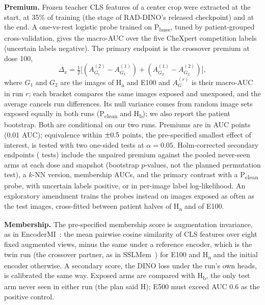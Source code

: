 \documentclass{article}
\begin{document}
\textbf{Premium.} Frozen teacher CLS features of a center crop were extracted at the start, at 35\% of training (the stage of RAD-DINO's released checkpoint) and at the end. A one-vs-rest logistic probe trained on P\textsubscript{base}, tuned by patient-grouped cross-validation, gives the macro-AUC over the five CheXpert competition labels (uncertain labels negative). The primary endpoint is the crossover premium at dose 100,
\begin{equation}
\Delta_x=\tfrac12\big[(A^{(2)}_{G_1}-A^{(1)}_{G_1})+(A^{(1)}_{G_2}-A^{(2)}_{G_2})\big],
\end{equation}
where $G_1$ and $G_2$ are the images of H\textsubscript{a} and E100 and $A^{(r)}_G$ is their macro-AUC in run $r$; each bracket compares the same images exposed and unexposed, and the average cancels run differences. Its null variance comes from random image sets exposed equally in both runs (P\textsubscript{clean} and H\textsubscript{b}); we also report the patient bootstrap. Both are conditional on our two runs. Premiums are in AUC points (0.01 AUC); equivalence within $\pm0.5$ points, the pre-specified smallest effect of interest, is tested with two one-sided tests at $\alpha=0.05$. Holm-corrected secondary endpoints (\HolmM{} tests) include the unpaired premium against the pooled never-seen arms at each dose and snapshot (bootstrap $p$-values, not the planned permutation test), a $k$-NN version, membership AUCs, and the primary contrast with a P\textsubscript{clean} probe, with uncertain labels positive, or in per-image label log-likelihood. An exploratory amendment trains the probes instead on images exposed as often as the test images, cross-fitted between patient halves of H\textsubscript{a} and of E100.

\textbf{Membership.} The pre-specified membership score is augmentation invariance, as in EncoderMI~\cite{liu2021encodermi}: the mean pairwise cosine similarity of CLS features over eight fixed augmented views, minus the same under a reference encoder, which is the twin run (the crossover partner, as in SSLMem~\cite{wang2024sslmem}) for E100 and H\textsubscript{a} and the initial encoder otherwise. A secondary score, the DINO loss under the run's own heads, is calibrated the same way. Exposed arms are compared with H\textsubscript{b}, the only test arm never seen in either run (the plan said H); E500 must exceed AUC 0.6 as the positive control.
\end{document}
